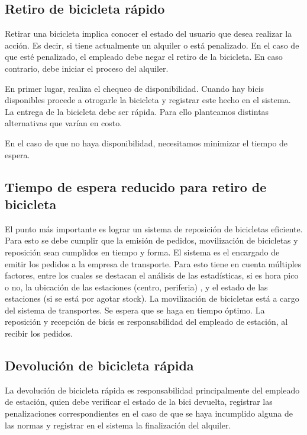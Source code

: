 \subsection{Retiro de bicicleta rápido}

Retirar una bicicleta implica conocer el estado del usuario que desea realizar la acción. Es decir, si tiene actualmente un alquiler o está penalizado. En el caso de que esté penalizado, el empleado debe negar el retiro de la bicicleta. En caso
contrario, debe iniciar el proceso del alquiler. 

En primer lugar, realiza el chequeo de disponibilidad. Cuando hay bicis
disponibles procede a otrogarle la bicicleta y registrar este hecho en el sistema. La entrega de la bicicleta debe ser rápida.
Para ello planteamos distintas alternativas que varían en costo. 

En el caso de que no haya disponibilidad, necesitamos minimizar el tiempo de espera. 

\subsection{Tiempo de espera reducido para retiro de bicicleta}

El punto más importante es lograr un sistema de reposición de bicicletas eficiente. Para esto se debe cumplir que la emisión de
pedidos, movilización de bicicletas y reposición sean cumplidos en tiempo y forma.
El sistema es el encargado de emitir los pedidos a la empresa de transporte. Para esto tiene en cuenta múltiples factores, entre
los cuales se destacan el análisis de las estadísticas, si es hora pico o no, la ubicación de las estaciones (centro, periferia)
, y el estado de las estaciones (si se está por agotar stock). 
La movilización de bicicletas está a cargo del sistema de transportes. Se espera que se haga en tiempo óptimo.
La reposición y recepción de bicis es responsabilidad del empleado de estación, al recibir los pedidos.

\subsection{Devolución de bicicleta rápida}

La devolución de bicicleta rápida es responsabilidad principalmente del empleado de estación, quien debe verificar el estado
de la bici devuelta, registrar las penalizaciones correspondientes en el caso de que se haya incumplido alguna de las normas y
registrar en el sistema la finalización del alquiler. 

